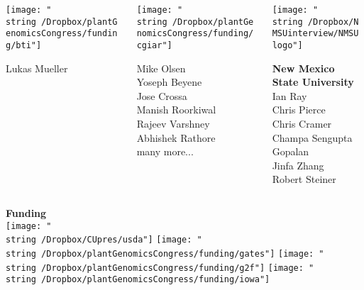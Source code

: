 \documentclass[11pt, aspectratio=169]{beamer}
\begin{document}
{\begin{columns}
\begin{column}{0.2\linewidth}
\vspace{0.5cm}

\texttt{[image: "\\string~/Dropbox/plantGenomicsCongress/funding/bti"]}

\scriptsize 
Lukas Mueller \\

\end{column}


\begin{column}{0.2\linewidth}


\texttt{[image: "\\string~/Dropbox/plantGenomicsCongress/funding/cgiar"]}

\scriptsize 
Mike Olsen \\
Yoseph Beyene \\
Jose Crossa \\
Manish Roorkiwal \\
Rajeev Varshney \\
Abhishek Rathore \\
many more...
\end{column}

\begin{column}{0.2\linewidth}


\texttt{[image: "\\string~/Dropbox/NMSUinterview/NMSUlogo"]}

\normalsize {\textbf{New Mexico State University}}
\scriptsize 
Ian Ray\\
Chris Pierce\\
Chris Cramer\\
Champa Sengupta Gopalan\\
Jinfa Zhang\\
Robert Steiner\\
\end{column}

\end{columns}

\textbf{Funding}\\
\texttt{[image: "\\string~/Dropbox/CUpres/usda"]} \hspace{0.5cm}
\texttt{[image: "\\string~/Dropbox/plantGenomicsCongress/funding/gates"]} \hspace{0.5cm}
\texttt{[image: "\\string~/Dropbox/plantGenomicsCongress/funding/g2f"]} \hspace{0.5cm}
\texttt{[image: "\\string~/Dropbox/plantGenomicsCongress/funding/iowa"]}


}
\end{document}
